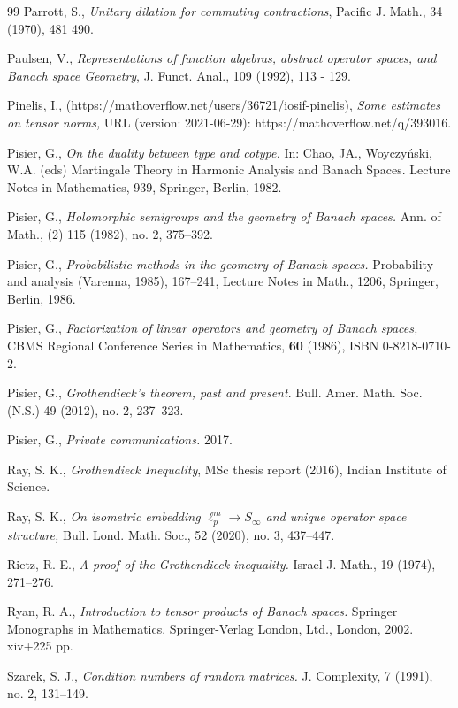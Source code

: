 \documentclass[a4paper,oneside,11pt, reqno]{amsart}
\numberwithin{equation}{section}
\theoremstyle{plain}
\begin{document}
\begin{thebibliography}{99}
  Parrott, S., \emph{Unitary dilation for commuting contractions}, Pacific J. Math., 34 (1970), 481 490.

  Paulsen, V., \emph{Representations of function algebras, abstract operator spaces, and Banach space Geometry}, J. Funct.  Anal.,  109 (1992), 113 - 129.

  Pinelis, I., (https://mathoverflow.net/users/36721/iosif-pinelis), \emph{Some estimates on tensor norms,} URL (version: 2021-06-29): https://mathoverflow.net/q/393016.
 

 Pisier, G.,  \emph{On the duality between type and cotype.} In: Chao, JA., Woyczyński, W.A. (eds) Martingale Theory in Harmonic Analysis and Banach Spaces. Lecture Notes in Mathematics, 939,  Springer, Berlin, 1982.

 Pisier, G.,
\emph{ Holomorphic semigroups and the geometry of Banach spaces.} 
 Ann. of Math., (2) 115 (1982), no. 2, 375–392. 

 Pisier, G., \emph{Probabilistic methods in the geometry of Banach spaces.} Probability and analysis (Varenna, 1985), 167–241, Lecture Notes in Math., 1206, Springer, Berlin, 1986. 

 Pisier, G., \emph{Factorization of linear operators and geometry of Banach spaces,} CBMS Regional Conference Series in Mathematics, \textbf{60} (1986), ISBN 0-8218-0710-2.

 Pisier, G., \textit{Grothendieck's theorem, past and present}. Bull. Amer. Math. Soc. (N.S.) 49 (2012), no. 2, 237--323.
 
  Pisier, G., \emph{Private communications.} 2017.

 Ray, S. K., \emph{Grothendieck Inequality}, MSc thesis report (2016), Indian Institute of Science.

 Ray, S. K., \emph{On isometric embedding $\ell_p^m\to S_\infty$ and unique operator space structure,} Bull. Lond. Math. Soc., 52 (2020), no. 3, 437–447.

Rietz, R. E.,
\emph{A proof of the Grothendieck inequality.}
Israel J. Math., 19 (1974), 271--276.

 Ryan, R. A., \emph{Introduction to tensor products of Banach spaces.} Springer Monographs in Mathematics. Springer-Verlag London, Ltd., London, 2002. xiv+225 pp.

 Szarek, S. J., \emph{Condition numbers of random matrices.} J. Complexity, 7 (1991), no. 2, 131–149. 


\end{thebibliography}
\end{document}
